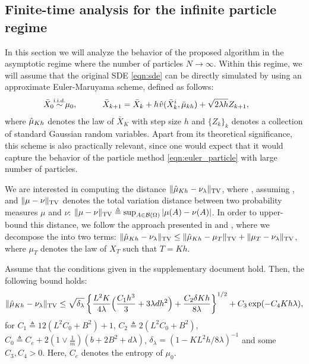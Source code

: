 
\subsection{Finite-time analysis for the infinite particle regime}



In this section we will analyze the behavior of the proposed algorithm in the asymptotic regime where the number of particles $N \rightarrow \infty$. Within this regime, we will assume that the original SDE \eqref{eqn:sde} can be directly simulated by using an approximate Euler-Maruyama scheme, defined as follows:
\begin{align}
\bar{X}_0 \simiid \mu_0, \quad \qquad \bar{X}_{k+1} = \bar{X}_k + h \hspace{0.5pt} \hat{v}(\bar{X}^i_k, \bar{\mu}_{kh} ) + \sqrt{2 \lambda h} Z_{k+1}, \qquad
\end{align}
where $\hat{\mu}_{Kh}$ denotes the law of $\bar{X}_K$ with step size $h$ and $\{Z_k\}_{k}$ denotes a collection of standard Gaussian random variables. Apart from its theoretical significance, this scheme is also practically relevant, since one would expect that it would capture the behavior of the particle method \eqref{eqn:euler_particle} with large number of particles. 

We are interested in computing the distance $\| \hat{\mu}_{Kh} - \nu_\lambda \|_{\textnormal{TV}}$, where , assuming , and $\|\mu-\nu\|_{\textnormal{TV}}$ denotes the total variation distance between two probability measures $\mu$ and $\nu$: $\|\mu-\nu\|_{\textnormal{TV}}\triangleq \sup_{A \in {\cal B}(\Omega)} |\mu(A) -\nu(A) |$. In order to upper-bound this distance, we follow the approach presented in \cite{dalalyan2017theoretical} and \cite{raginsky17a}, where we decompose the into two terms: $\| \hat{\mu}_{Kh} - \nu_\lambda \|_{\textnormal{TV}} \leq \| \hat{\mu}_{Kh} - \mu_T \|_{\textnormal{TV}} + \| \mu_{T} - \nu_\lambda \|_{\textnormal{TV}}$, where $\mu_T$ denotes the law of $X_T$ such that $T=Kh$.



\begin{thm}
\label{thm:euler}
Assume that the conditions given in the supplementary document hold. Then, the following bound holds:
\begin{align}
\| \hat{\mu}_{Kh} - \nu_\lambda \|_{\textnormal{TV}} \leq \sqrt{\delta_\lambda} \left \lbrace  \frac{L^2 K}{4\lambda} \Bigl( \frac{C_1 h^3}{3} + 3 \lambda d h^2 \Bigr) + \frac{C_2  \delta K h}{8\lambda} \right \rbrace^{1/2} +  C_3 \exp(-C_4 Kh \lambda),
\end{align}
for $C_1 \triangleq 12(L^2 C_0 + B^2)+1$, $C_2 \triangleq 2 (L^2 C_0 + B^2)$, $C_0 \triangleq C_e +2  (1 \vee \frac1{m})(b+2B^2 + d \lambda)$, $\delta_\lambda = (1 -{KL^2h}/{8\lambda})^{-1} $ and some $C_3,C_4 > 0$. Here, $C_e$ denotes the entropy of $\mu_0$.
\end{thm}

